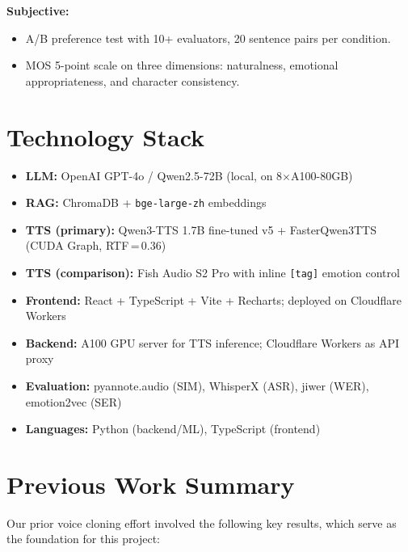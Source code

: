 \documentclass[11pt,a4paper]{article}
\begin{document}
\textbf{Subjective:}
\begin{itemize}
    \item A/B preference test with 10+ evaluators, 20 sentence pairs per condition.
    \item MOS 5-point scale on three dimensions: naturalness, emotional appropriateness, and character consistency.
\end{itemize}

\section{Technology Stack}

\begin{itemize}
    \item \textbf{LLM:} OpenAI GPT-4o / Qwen2.5-72B (local, on 8$\times$A100-80GB)
    \item \textbf{RAG:} ChromaDB + \texttt{bge-large-zh} embeddings
    \item \textbf{TTS (primary):} Qwen3-TTS 1.7B fine-tuned v5 + FasterQwen3TTS (CUDA Graph, RTF\,=\,0.36)
    \item \textbf{TTS (comparison):} Fish Audio S2 Pro with inline \texttt{[tag]} emotion control
    \item \textbf{Frontend:} React + TypeScript + Vite + Recharts; deployed on Cloudflare Workers
    \item \textbf{Backend:} A100 GPU server for TTS inference; Cloudflare Workers as API proxy
    \item \textbf{Evaluation:} pyannote.audio (SIM), WhisperX (ASR), jiwer (WER), emotion2vec (SER)
    \item \textbf{Languages:} Python (backend/ML), TypeScript (frontend)
\end{itemize}

\section{Previous Work Summary}

Our prior voice cloning effort involved the following key results, which serve as the foundation for this project:
\end{document}
